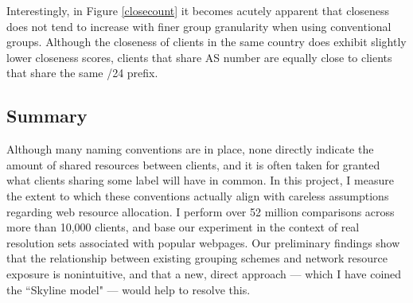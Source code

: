 Interestingly, in Figure \ref{closecount} it becomes acutely apparent that closeness does not
tend to increase with finer group granularity when using conventional groups. Although the closeness
of clients in the same country does exhibit slightly lower closeness scores, clients that share AS
number are equally close to clients that share the same /24 prefix.

\subsection{Summary}

Although many naming conventions are in place, none directly indicate the amount of shared resources
between clients, and it is often taken for granted what clients sharing some label will have in
common. In this project, I measure the extent to which these conventions actually align with
careless assumptions regarding web resource allocation. I perform over 52 million comparisons
across more than 10,000 clients, and base our experiment in the context of real resolution sets
associated with popular webpages. Our preliminary findings show that the relationship between
existing grouping schemes and network resource exposure is nonintuitive, and that a new, direct
approach --- which I have coined the ``Skyline model" --- would help to resolve this. 
